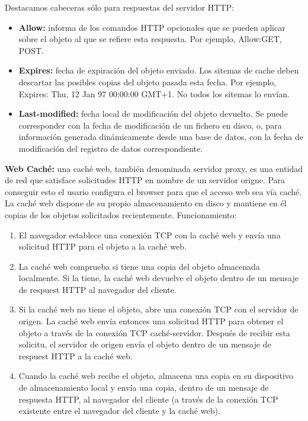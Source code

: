 \documentclass[a4paper,11pt]{article}
\begin{document}
Destacamos cabeceras sólo para respuestas del servidor HTTP:

\begin{itemize}
\item \textbf{Allow:} informa de los comandos HTTP opcionales que se pueden aplicar sobre el objeto al que se refiere esta respuesta. Por ejemplo, Allow:GET, POST.

\item \textbf{Expires:} fecha de expiración del objeto enviado. Los sitemas de cache deben descartar las posibles copias del objeto pasada esta fecha. Por ejemplo, Expires: Thu, 12 Jan 97 00:00:00 GMT+1. No todos los sitemas lo envían.

\item \textbf{Last-modified:} fecha local de modificación del objeto devuelto. Se puede corresponder con la fecha de modificación de un fichero en disco, o, para información generada dinámicamente desde una base de datos, con la fecha de modificación del registro de datos correspondiente.
\end{itemize}

\textbf{Web Caché:}  una caché web, también denominada servidor proxy, es una entidad de red que satisface solicitudes HTTP en nombre de un servidor origne. Para conseguir esto el usario configura el browser para que el acceso web sea vía caché. La caché web dispone de su propio almacenamiento en disco y mantiene en él copias de los objetos solicitados recientemente. Funcionamiento: 

\begin{enumerate}
\item El navegador establece una conexión TCP con la caché web y envía una solicitud HTTP para el objeto a la caché web.

\item La caché web comprueba si tiene una copia del objeto almacenada localmente. Si la tiene, la caché web devuelve el objeto dentro de un mensaje de respuest HTTP al navegador del cliente.

\item Si la caché web no tiene el objeto, abre una conexión TCP con el servidor de origen. La caché web envía entonces una solicitud HTTP para obtener el objeto a través de la conexión TCP caché-servidor. Después de recibir esta solicitu, el servidor de origen envía el objeto dentro de un mensaje de respuest HTTP a la caché web.

\item Cuando la caché web recibe el objeto, almacena una copia en su dispositivo de almacenamiento local y envía una copia, dentro de un mensaje de respuesta HTTP, al navegador del cliente (a través de la conexión TCP existente entre el navegador del cliente y la caché web).
\end{enumerate}
\end{document}

